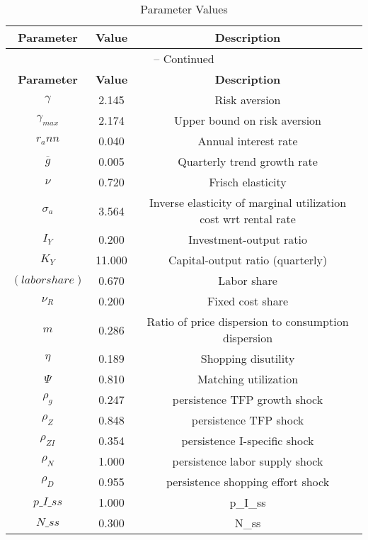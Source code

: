 \begin{center}
\begin{longtable}{ccc}
\caption{Parameter Values}\\%
\toprule%
\multicolumn{1}{c}{\textbf{Parameter}} &
\multicolumn{1}{c}{\textbf{Value}} &
 \multicolumn{1}{c}{\textbf{Description}}\\%
\midrule%
\endfirsthead
\multicolumn{3}{c}{{\tablename} \thetable{} -- Continued}\\%
\midrule%
\multicolumn{1}{c}{\textbf{Parameter}} &
\multicolumn{1}{c}{\textbf{Value}} &
  \multicolumn{1}{c}{\textbf{Description}}\\%
\midrule%
\endhead
${\gamma}$ 	 & 	 2.145 	 & 	 Risk aversion\\
${\gamma_{max}}$ 	 & 	 2.174 	 & 	 Upper bound on risk aversion\\
${r_ann}$ 	 & 	 0.040 	 & 	 Annual interest rate\\
${\overline{g}}$ 	 & 	 0.005 	 & 	 Quarterly trend growth rate\\
$\nu$ 	 & 	 0.720 	 & 	 Frisch elasticity\\
${\sigma_a}$ 	 & 	 3.564 	 & 	 Inverse elasticity of marginal utilization cost wrt rental rate\\
${I_Y}$ 	 & 	 0.200 	 & 	 Investment-output ratio\\
${K_Y}$ 	 & 	 11.000 	 & 	 Capital-output ratio (quarterly)\\
$(labor share)$ 	 & 	 0.670 	 & 	 Labor share\\
${\nu_R}$ 	 & 	 0.200 	 & 	 Fixed cost share\\
${m}$ 	 & 	 0.286 	 & 	 Ratio of price dispersion to consumption dispersion\\
${\eta}$ 	 & 	 0.189 	 & 	 Shopping disutility\\
${\Psi}$ 	 & 	 0.810 	 & 	 Matching utilization\\
${\rho_g}$ 	 & 	 0.247 	 & 	 persistence TFP growth shock\\
${\rho_Z}$ 	 & 	 0.848 	 & 	 persistence TFP shock\\
${\rho_{ZI}}$ 	 & 	 0.354 	 & 	 persistence I-specific shock\\
${\rho_N}$ 	 & 	 1.000 	 & 	 persistence labor supply shock\\
${\rho_D}$ 	 & 	 0.955 	 & 	 persistence shopping effort shock\\
$p\_I\_ss$ 	 & 	 1.000 	 & 	 p\_I\_ss\\
$N\_ss$ 	 & 	 0.300 	 & 	 N\_ss\\
\bottomrule%
\end{longtable}
\end{center}
